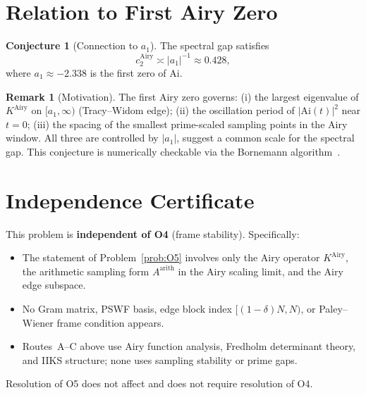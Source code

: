 \documentclass[12pt,a4paper]{amsart}
\theoremstyle{definition}
\newtheorem{remark}[theorem]{Remark}
\newtheorem{conjecture}[theorem]{Conjecture}
\newcommand{\Ai}{\mathrm{Ai}}
\newcommand{\KAi}{K^{\mathrm{Airy}}}
\begin{document}
\section{Relation to First Airy Zero}
\label{sec:zero}

\begin{conjecture}[Connection to $a_1$]\label{conj:a1}
The spectral gap satisfies
\[
  c_2^{\mathrm{Airy}}
  \asymp |a_1|^{-1}
  \approx 0.428,
\]
where $a_1 \approx -2.338$ is the first zero of $\Ai$.
\end{conjecture}

\begin{remark}[Motivation]
The first Airy zero governs:
(i) the largest eigenvalue of $\KAi$ on $[a_1, \infty)$
(Tracy--Widom edge);
(ii) the oscillation period of $|\Ai(t)|^2$ near $t = 0$;
(iii) the spacing of the smallest prime-scaled sampling
points in the Airy window.
All three are controlled by $|a_1|$,
suggest a common scale for the spectral gap.
This conjecture is numerically checkable via the
Bornemann algorithm~\cite{Bornemann2010}.
\end{remark}

\section{Independence Certificate}
\label{sec:independence}

This problem is \textbf{independent of O4} (frame stability).
Specifically:
\begin{itemize}
  \item The statement of Problem~\ref{prob:O5} involves
    only the Airy operator $\KAi$, the arithmetic sampling form
    $A^{\mathrm{arith}}$ in the Airy scaling limit,
    and the Airy edge subspace.
  \item No Gram matrix, PSWF basis, edge block index
    $[(1-\delta)N, N)$, or Paley--Wiener frame condition appears.
  \item Routes~A--C above use Airy function analysis,
    Fredholm determinant theory, and IIKS structure;
    none uses sampling stability or prime gaps.
\end{itemize}

Resolution of O5 does not affect and does not require
resolution of O4.
\end{document}
